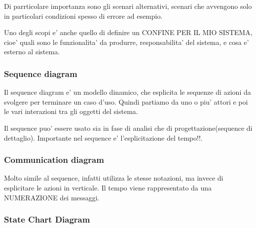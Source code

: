 Di parrticolare importanza sono gli scenari alternativi, scenari che avvengono solo in particolari
condizioni spesso di errore ad esempio.

Uno degli scopi e' anche quello di definire un CONFINE PER IL MIO SISTEMA, cioe' quali sono le 
funzionalita' da produrre, responsabilita' del sistema, e cosa e' esterno al sistema.

\subsubsection{Sequence diagram}
Il sequence diagram e' un modello dinamico, che esplicita le sequenze di azioni da svolgere
per terminare un caso d'uso.
Quindi partiamo da uno o piu' attori e poi le vari interazioni tra gli oggetti del sistema.

Il sequence puo' essere usato sia in fase di analisi che di progettazione(sequence di dettaglio).
Importante nel sequence e' l'esplicitazione del tempo!!.

\subsubsection{Communication diagram}
Molto simile al sequence, infatti utilizza le stesse notazioni, ma invece di esplicitare le azioni in verticale.
Il tempo viene rappresentato da una NUMERAZIONE dei messaggi.
\subsubsection{State Chart Diagram}
